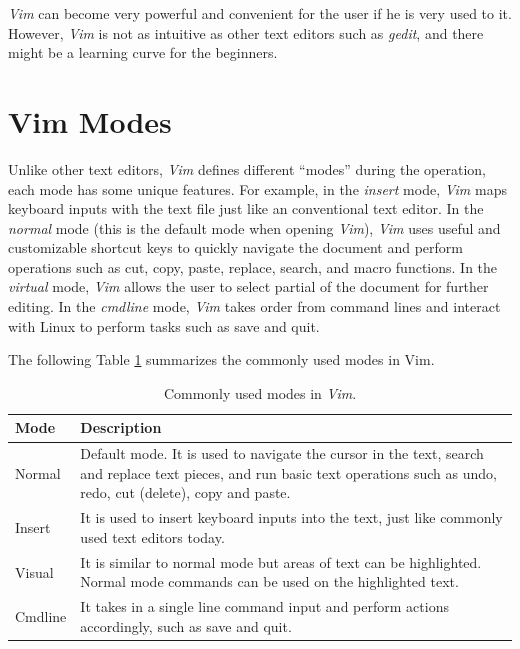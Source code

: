 \textit{Vim} can become very powerful and convenient for the user if he is very used to it. However, \textit{Vim} is not as intuitive as other text editors such as \textit{gedit}, and there might be a learning curve for the beginners.

\section{Vim Modes} \label{ch:tfe:subsec:vimgeneralintro}

Unlike other text editors, \textit{Vim} defines different ``modes'' during the operation, each mode has some unique features. For example, in the \textit{insert} mode, \textit{Vim} maps keyboard inputs with the text file just like an conventional text editor. In the \textit{normal} mode (this is the default mode when opening \textit{Vim}), \textit{Vim} uses useful and customizable shortcut keys to quickly navigate the document and perform operations such as cut, copy, paste, replace, search, and macro functions. In the \textit{virtual} mode, \textit{Vim} allows the user to select partial of the document for further editing. In the \textit{cmdline} mode, \textit{Vim} takes order from command lines and interact with Linux to perform tasks such as save and quit.

The following Table \ref{ch:tfe:tab:vimmodes} summarizes the commonly used modes in Vim.
\begin{table}
  \centering \caption{Commonly used modes in \textit{Vim}.}\label{ch:tfe:tab:vimmodes}
  \begin{tabularx}{\textwidth}{lX}
    \hline
    Mode & Description \\ \hline
    Normal & Default mode. It is used to navigate the cursor in the text, search and replace text pieces, and run basic text operations such as undo, redo, cut (delete), copy and paste. \\ \hdashline
    Insert & It is used to insert keyboard inputs into the text, just like commonly used text editors today. \\ \hdashline
    Visual & It is similar to normal mode but areas of text can be highlighted. Normal mode commands can be used on the highlighted text. \\ \hdashline
    Cmdline & It takes in a single line command input and perform actions accordingly, such as save and quit. \\
    \hline
  \end{tabularx}
\end{table}

